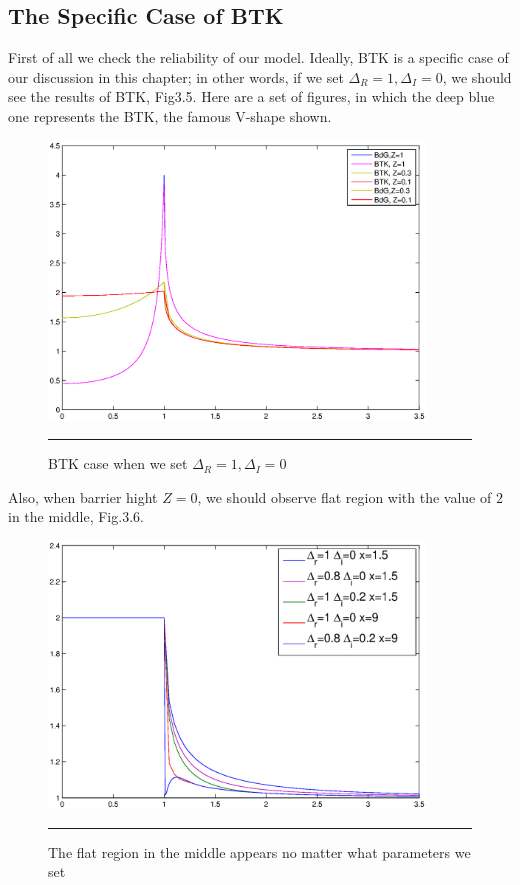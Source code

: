  \subsection{The Specific Case of BTK}
 First of all we check the reliability of our model. Ideally, BTK is a specific case of our discussion in this chapter; in other words, if we set $\Delta_R=1,\Delta_I=0$, we should see the results of BTK, Fig3.5.
Here are a set of figures, in which the deep blue one represents the BTK, the famous V-shape shown.
\begin{figure}[htbp]
\small
	\centering
		\includegraphics[width=10cm]{./Figures/3-2-8.eps}
		\rule{35em}{0.5pt}
	\caption[An Electron]{BTK case when we set $\Delta_R=1,\Delta_I=0$}
	\label{fig:Electron}
\end{figure}
 Also, when barrier hight $Z=0$, we should observe flat region with the value of $2$ in the middle, Fig.3.6.
\begin{figure}[htbp]
\small
	\centering
		\includegraphics[width=10cm]{./Figures/3-2-9.eps}
		\rule{35em}{0.5pt}
	\caption[An Electron]{The flat region in the middle appears no matter what parameters we set}
	\label{fig:Electron}
\end{figure}


